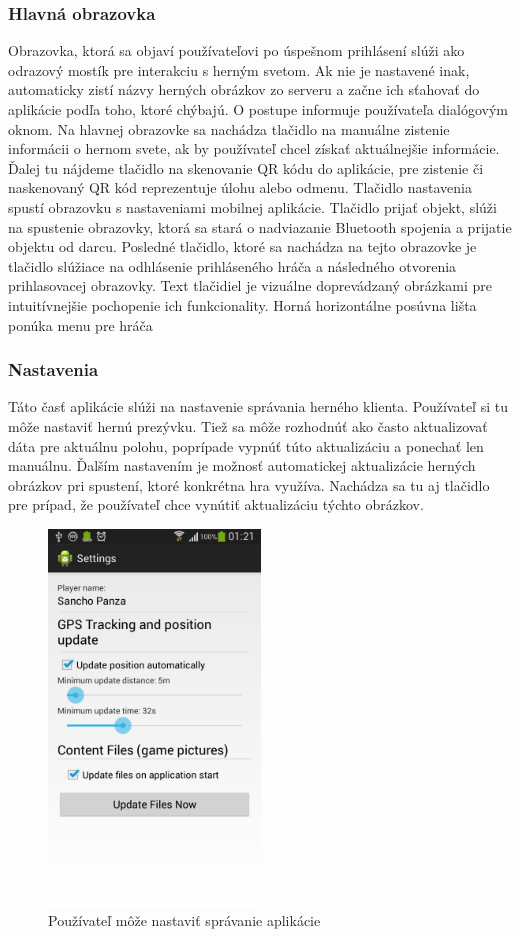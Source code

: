 \subsubsection{Hlavná obrazovka}
Obrazovka, ktorá sa objaví používateľovi po úspešnom prihlásení slúži ako odrazový mostík pre interakciu s herným svetom. Ak nie je nastavené inak, automaticky zistí názvy herných obrázkov zo serveru a začne ich sťahovať do aplikácie podľa toho, ktoré chýbajú. O postupe informuje používateľa dialógovým oknom. Na hlavnej obrazovke sa nachádza tlačidlo na manuálne zistenie informácii o hernom svete, ak by používateľ chcel získať aktuálnejšie informácie. Ďalej tu nájdeme tlačidlo na skenovanie QR kódu do aplikácie, pre zistenie či naskenovaný QR kód reprezentuje úlohu alebo odmenu. Tlačidlo nastavenia spustí obrazovku s nastaveniami mobilnej aplikácie. Tlačidlo prijať objekt, slúži na spustenie obrazovky, ktorá sa stará o nadviazanie Bluetooth spojenia a prijatie objektu od darcu. Posledné tlačidlo, ktoré sa nachádza na tejto obrazovke je tlačidlo slúžiace na odhlásenie prihláseného hráča a následného otvorenia prihlasovacej obrazovky. Text tlačidiel je vizuálne doprevádzaný obrázkami pre intuitívnejšie pochopenie ich funkcionality. Horná horizontálne posúvna lišta ponúka menu pre hráča

\subsubsection{Nastavenia}
Táto časť aplikácie slúži na nastavenie správania herného klienta. Používateľ si tu môže nastaviť hernú prezývku. Tiež sa môže rozhodnúť ako často aktualizovať dáta pre aktuálnu polohu, poprípade vypnúť túto aktualizáciu a ponechať len manuálnu. Ďalším nastavením je možnosť automatickej aktualizácie herných obrázkov pri spustení, ktoré konkrétna hra využíva. Nachádza sa tu aj tlačidlo pre prípad, že používateľ chce vynútiť aktualizáciu týchto obrázkov.

\begin{figure}[h]
  \centering
  \includegraphics[height=10cm]{mainmatter/imgs/klient_settings.png}
  \caption{Používateľ môže nastaviť správanie aplikácie}
  \label{fig:klient_settings}
\end{figure}



